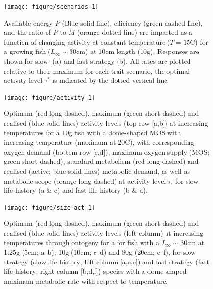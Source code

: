 \documentclass[11pt]{article}\usepackage[]{graphicx}\usepackage[]{color,soul}
\begin{document}
\begin{figure}[!ht]
{\centering 
\texttt{[image: figure/scenarios-1]} 
}
\caption[Available energy $P$ (Blue solid line), efficiency (green dashed line), and the ratio of $P$ to $M$ (orange dotted line) are impacted as a function of changing activity at constant temperature ($T=15$\degree C) for a growing fish ($L_{\infty}\sim 30$cm) at 10cm length (10g)]{Available energy $P$ (Blue solid line), efficiency (green dashed line), and the ratio of $P$ to $M$ (orange dotted line) are impacted as a function of changing activity at constant temperature ($T=15$\degree C) for a growing fish ($L_{\infty}\sim 30$cm) at 10cm length (10g). Responses are shown for slow- (a) and fast strategy (b). All rates are plotted relative to their maximum for each trait scenario, the optimal activity level $\tau^*$ is indicated by the dotted vertical line.}\label{fig:scenarios}
\end{figure}

\begin{figure}[!ht]
\centering
\texttt{[image: figure/activity-1]}
\caption{Optimum (red long-dashed), maximum (green short-dashed) and realised (blue solid lines) activity levels (top row [a,b]) at increasing temperatures for a 10g fish with a dome-shaped MOS with increasing temperature (maximum at 20\degree C), with corresponding oxygen demand (bottom row [c,d]); maximum oxygen supply (MOS; green short-dashed), standard metabolism (red long-dashed) and realised (active; blue solid lines) metabolic demand, as well as metabolic scope (orange long-dashed) at activity level $\tau$, for slow life-history (a \& c) and fast life-history (b \& d).}
\label{fig:activity}
\end{figure}

\begin{figure}[!ht]
{\centering 
  \texttt{[image: figure/size-act-1]} 
}
\caption[Optimum (red long-dashed), maximum (green short-dashed) and realised (blue solid lines) activity levels (left column) at increasing temperatures through ontogeny for a for fish with a $L_{\infty}\sim 30$cm at 1.25g (5cm]{Optimum (red long-dashed), maximum (green short-dashed) and realised (blue solid lines) activity levels (left column) at increasing temperatures through ontogeny for a for fish with a $L_{\infty}\sim 30$cm at 1.25g (5cm; a--b); 10g (10cm; c--d) and 80g (20cm; e--f), for slow strategy (slow life history; left column [a,c,e]) and fast strategy (fast life-history; right column [b,d,f]) species with a dome-shaped maximum metabolic rate with respect to temperature.}\label{fig:size-act}
\end{figure}
\end{document}
